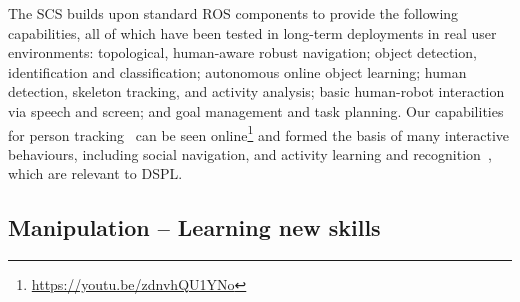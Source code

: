 \documentclass[runningheads,a4paper]{llncs}
\begin{document}
The SCS builds upon standard ROS components to provide the following capabilities, all of which have been tested in long-term deployments in real user environments: topological, human-aware robust navigation; object detection, identification and classification; autonomous online object learning; human detection, skeleton tracking, and activity analysis; basic human-robot interaction via speech and screen; and goal management and task planning. Our capabilities for person tracking~\cite{dondrup2015tracker} can be seen online\footnote{\url{https://youtu.be/zdnvhQU1YNo}} and formed the basis of many interactive behaviours, including social navigation, and activity learning and recognition~\cite{duckworth_aamas2016}, which are relevant to DSPL. 


\subsection{Manipulation -- Learning new skills}
\end{document}

